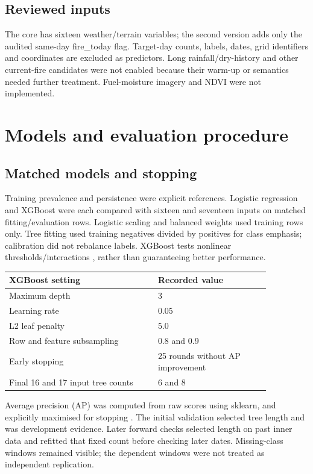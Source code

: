 \subsection*{Reviewed inputs}

The core has sixteen weather/terrain variables; the second version adds only the audited same-day fire\_today flag. Target-day counts, labels, dates, grid identifiers and coordinates are excluded as predictors. Long rainfall/dry-history and other current-fire candidates were not enabled because their warm-up or semantics needed further treatment. Fuel-moisture imagery and NDVI were not implemented.

\clearpage
\section*{Models and evaluation procedure}
\subsection*{Matched models and stopping}

Training prevalence and persistence were explicit references. Logistic regression and XGBoost were each compared with sixteen and seventeen inputs on matched fitting/evaluation rows. Logistic scaling and balanced weights used training rows only. Tree fitting used training negatives divided by positives for class emphasis; calibration did not rebalance labels. XGBoost tests nonlinear thresholds/interactions \cite{mlChen2016}, rather than guaranteeing better performance.

\begin{center}\small\setlength{\tabcolsep}{3pt}
\begin{tabular}{p{0.490\linewidth}p{0.370\linewidth}}
\hline
XGBoost setting & Recorded value \\ \hline
Maximum depth & 3 \\
Learning rate & 0.05 \\
L2 leaf penalty & 5.0 \\
Row and feature subsampling & 0.8 and 0.9 \\
Early stopping & 25 rounds without AP improvement \\
Final 16 and 17 input tree counts & 6 and 8 \\
\hline\end{tabular}\end{center}

Average precision (AP) was computed from raw scores using sklearn, and explicitly maximised for stopping \cite{mlAveragePrecision}. The initial validation selected tree length and was development evidence. Later forward checks selected length on past inner data and refitted that fixed count before checking later dates. Missing-class windows remained visible; the dependent windows were not treated as independent replication.

